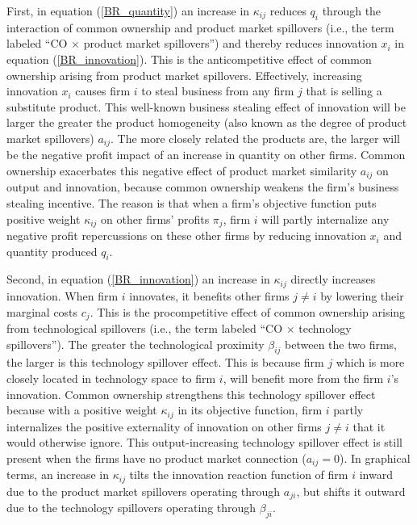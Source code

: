 \documentclass[12pt]{article}
\begin{document}
First, in equation (\ref{BR_quantity}) an increase in $\kappa_{ij}$ reduces $q_{i}$ through the interaction of common ownership and product market spillovers (i.e., the term labeled ``CO $\times$ product market spillovers'') and thereby reduces innovation $x_{i}$ in equation (\ref{BR_innovation}). This is the anticompetitive effect of common ownership arising from product market spillovers. Effectively, increasing innovation $x_{i}$ causes firm $i$ to steal business from any firm $j$ that is selling a substitute product. This well-known business stealing effect of innovation will be larger the greater the product homogeneity (also known as the degree of product market spillovers) $a_{ij}$. The more closely related the products are, the larger will be the negative profit impact of an increase in quantity on other firms. Common ownership exacerbates this negative effect of product market similarity $a_{ij}$ on output and innovation, because common ownership weakens the firm's business stealing incentive. The reason is that when a firm's objective function puts positive weight $\kappa_{ij}$ on other firms' profits $\pi_{j}$, firm $i$ will partly internalize any negative profit repercussions on these other firms by reducing innovation $x_{i}$ and quantity produced $q_{i}$.

Second, in equation (\ref{BR_innovation}) an increase in $\kappa_{ij}$ directly increases innovation. When firm $i$ innovates, it benefits other firms $j \neq i$ by lowering their marginal costs $c_{j}$. This is the procompetitive effect of common ownership arising from technological spillovers (i.e., the term labeled ``CO $\times$ technology spillovers''). The greater the technological proximity $\beta_{ij}$ between the two firms, the larger is this technology spillover effect. This is because firm $j$ which is more closely located in technology space to firm $i$, will benefit more from the firm $i$'s innovation. Common ownership strengthens this technology spillover effect because with a positive weight $\kappa_{ij}$ in its objective function, firm $i$ partly internalizes the positive externality of innovation on other firms $j \neq i$ that it would otherwise ignore.
This output-increasing technology spillover effect is still present when the firms have no product market connection ($a_{ij}=0$). In graphical terms, an increase in $\kappa_{ij}$ tilts the innovation reaction function of firm $i$ inward due to the product market spillovers operating through $a_{ji}$, but shifts it outward due to the technology spillovers operating through $\beta_{ji}$.
\end{document}
